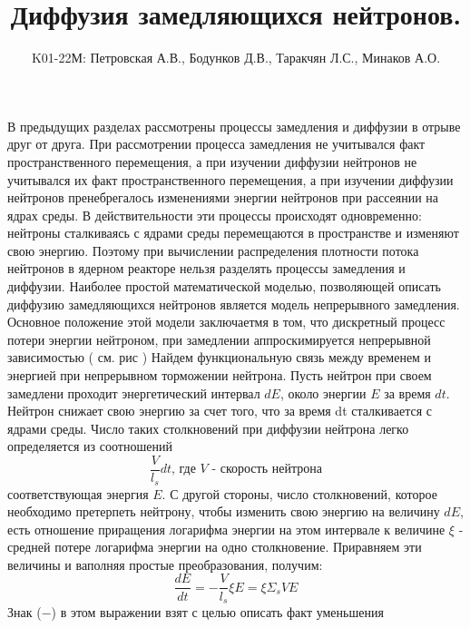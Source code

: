 \documentclass[a4paper]{article}
\title{Диффузия замедляющихся нейтронов.}
\author{
    K01-22М:
    Петровская А.В., Бодунков Д.В.,
    Таракчян Л.С., Минаков А.О.}
\begin{document}
    \maketitle

    В предыдущих разделах рассмотрены процессы замедления
    и диффузии в отрыве друг от друга. При рассмотрении процесса
    замедления не учитывался факт пространственного перемещения,
    а при изучении диффузии нейтронов не учитывался их факт
    пространственного перемещения, а при изучении диффузии нейтронов
    пренебрегалось изменениями энергии нейтронов при рассеянии на
    ядрах среды. В действительности эти процессы происходят
    одновременно: нейтроны сталкиваясь с ядрами среды перемещаются
    в пространстве и изменяют свою энергию. Поэтому при вычислении
    распределения плотности потока нейтронов в ядерном реакторе
    нельзя разделять процессы замедления и диффузии. Наиболее
    простой математической моделью, позволяющей описать диффузию
    замедляющихся нейтронов является модель непрерывного замедления.
    \newline
    Основное положение этой модели заключаетмя в том, что
    дискретный процесс потери энергии нейтроном, при замедлении
    аппроскимируется непрерывной зависимостью ( см. рис )
    \newline
    Найдем функциональную связь между временем и энергией
    при непрерывном торможении нейтрона. Пусть нейтрон при
    своем замедлени проходит энергетический интервал $dE$,
    около энергии $E$ за время $dt$. Нейтрон снижает свою
    энергию за счет того, что за время dt сталкивается с ядрами среды.
    \newline
    Число таких столкновений при диффузии нейтрона легко определяется 
    из соотношений
    \begin{equation}
        \frac{V}{l_s}dt
        \text{, где $V$ - скорость нейтрона}
    \end{equation}
    соответствующая энергия $E$.
    \newline
    С другой стороны, число столкновений, которое необходимо
    претерпеть нейтрону, чтобы изменить свою энергию на величину $dE$,
    есть отношение приращения логарифма энергии на этом интервале к
    величине $\xi$ - средней потере логарифма энергии на одно
    столкновение. Приравняем эти величины и ваполняя простые
    преобразования, получим:
    \begin{equation}
        \frac{dE}{dt} = -\frac{V}{l_s}\xi E = \xi \Sigma_s V E
    \end{equation}
    Знак ($-$) в этом выражении взят с целью описать факт уменьшения
\end{document}
